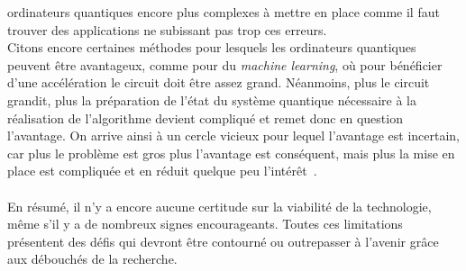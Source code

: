 ordinateurs quantiques encore plus complexes à mettre en place comme il faut trouver des applications
ne subissant pas trop ces erreurs.\\
Citons encore certaines méthodes pour lesquels les ordinateurs quantiques peuvent être avantageux,
comme pour du \textit{machine learning}, où pour bénéficier d'une accélération le circuit doit être
assez grand.
Néanmoins, plus le circuit grandit, plus la préparation de l'état du système quantique nécessaire à
la réalisation de l'algorithme devient compliqué et remet donc en question l'avantage.
On arrive ainsi à un cercle vicieux pour lequel l'avantage est incertain, car plus le problème est
gros plus l'avantage est conséquent, mais plus la mise en place est compliquée et en réduit quelque
peu l'intérêt~\cite{McClean2018}.\\ \\
En résumé, il n'y a encore aucune certitude sur la viabilité de la technologie, même s'il y a de
nombreux signes encourageants.
Toutes ces limitations présentent des défis qui devront être contourné ou outrepasser à l'avenir
grâce aux débouchés de la recherche.

